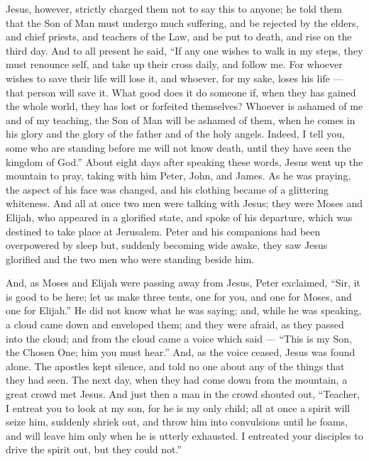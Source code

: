  Jesus, however, strictly charged them not to say this to
anyone;  he told them that the Son of Man must undergo much
suffering, and be rejected by the elders, and chief priests, and
teachers of the Law, and be put to death, and rise on the third day.
 And to all present he said, ``If any one wishes to walk in
my steps, they must renounce self, and take up their cross daily, and
follow me.  For whoever wishes to save their life will lose
it, and whoever, for my sake, loses his life --- that person will save
it.  What good does it do someone if, when they has gained
the whole world, they has lost or forfeited themselves? 
Whoever is ashamed of me and of my teaching, the Son of Man will be
ashamed of them, when he comes in his glory and the glory of the father
and of the holy angels.  Indeed, I tell you, some who are
standing before me will not know death, until they have seen the kingdom
of God.''  About eight days after speaking these words,
Jesus went up the mountain to pray, taking with him Peter, John, and
James.  As he was praying, the aspect of his face was
changed, and his clothing became of a glittering whiteness.
 And all at once two men were talking with Jesus; they were
Moses and Elijah,  who appeared in a glorified state, and
spoke of his departure, which was destined to take place at Jerusalem.
 Peter and his companions had been overpowered by sleep
but, suddenly becoming wide awake, they saw Jesus glorified and the two
men who were standing beside him.

 And, as Moses and Elijah were passing away from Jesus,
Peter exclaimed, ``Sir, it is good to be here; let us make three tents,
one for you, and one for Moses, and one for Elijah.'' He did not know
what he was saying;  and, while he was speaking, a cloud
came down and enveloped them; and they were afraid, as they passed into
the cloud;  and from the cloud came a voice which said ---
``This is my Son, the Chosen One; him you must hear.'' 
And, as the voice ceased, Jesus was found alone. The apostles kept
silence, and told no one about any of the things that they had seen.
 The next day, when they had come down from the mountain, a
great crowd met Jesus.  And just then a man in the crowd
shouted out, ``Teacher, I entreat you to look at my son, for he is my
only child;  all at once a spirit will seize him, suddenly
shriek out, and throw him into convulsions until he foams, and will
leave him only when he is utterly exhausted.  I entreated
your disciples to drive the spirit out, but they could not.''

